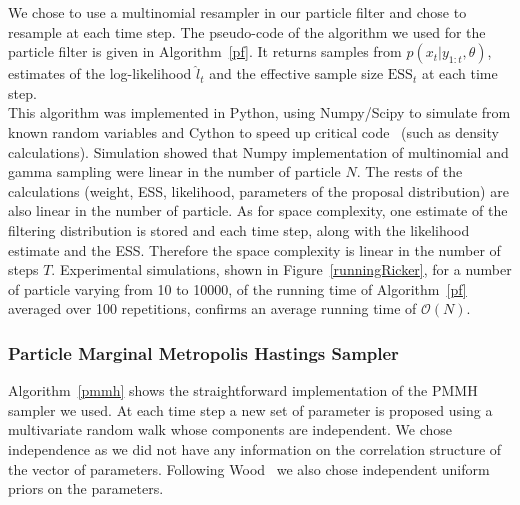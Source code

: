 \documentclass{article}
\begin{document}
	We chose to use a multinomial resampler in our particle filter and chose to resample at each time step. The pseudo-code of the algorithm we used for the particle filter is given in Algorithm~\ref{pf}. It returns samples from $p(x_t | y_{1:t}, \theta)$, estimates of the log-likelihood $\hat{l}_t$ and the effective sample size $\mathrm{ESS}_t$ at each time step. \\
	This algorithm was implemented in Python, using Numpy/Scipy to simulate from known random variables and Cython to speed up critical code~\cite{wilbers2009using, behnel2011cython} (such as density calculations). Simulation showed that Numpy implementation of multinomial and gamma sampling were linear in the number of particle $N$. The rests of the calculations (weight, ESS, likelihood, parameters of the proposal distribution) are also linear in the number of particle. As for space complexity, one estimate of the filtering distribution is stored and each time step, along with the likelihood estimate and the ESS. Therefore the space complexity is linear in the number of steps $T$. Experimental simulations, shown in Figure~\ref{runningRicker}, for a number of particle varying from 10 to 10000, of the running time of Algorithm~\ref{pf} averaged over 100 repetitions, confirms an average running time of $\mathcal{O}(N)$.
	
	\subsubsection{Particle Marginal Metropolis Hastings Sampler}
	Algorithm~\ref{pmmh} shows the straightforward implementation of the PMMH sampler we used. At each time step a new set of parameter is proposed using a multivariate random walk whose components are independent. We chose independence as we did not have any information on the correlation structure of the vector of parameters. Following Wood~\cite{fasiolo2014statistical} we also chose independent uniform priors on the parameters. \\
	
\end{document}
